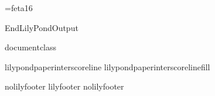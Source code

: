 
\def\ifundefined#1{\expandafter\ifx\csname#1\endcsname\relax}



\font\fetasixteen=feta16
\def\fetafont{\fetasixteen}
\def\fetachar#1{\hbox{\fetasixteen#1}}

\ifx\mustmakelilypondtitle\undefined\else\makelilypondtitle\fi
\ifx\mustmakelilypondpiecetitle\undefined\else\makelilypondpiecetitle\fi
%
\def\SkipLilydefs{\endinput}
\ifundefined{EndLilyPondOutput}
        \def\EndLilyPondOutput{\csname bye\endcsname}
        \def\SkipLilydefs{}
\fi
\SkipLilydefs

\ifundefined{documentclass}
        
\else
        
\fi

\def\botalign#1{\vbox to 0pt{\vss #1}}
\def\leftalign#1{\hbox to 0pt{#1\hss}}

\def\myfilbreak{\par\vfil\penalty200\vfilneg}

\ifundefined{lilypondpaperinterscoreline}
        \def\lilypondpaperinterscoreline{16}
\fi
\ifundefined{lilypondpaperinterscorelinefill}
        \def\lilypondpaperinterscorelinefill{0}
\else
        \def\lilypondpaperinterscorelinefill{1}
\fi

\def\interscoreline{\vskip\lilypondpaperinterscoreline pt plus %
  \lilypondpaperinterscorelinefill fill}

\def\placebox#1#2#3{%
        \botalign{\hbox{\raise #1\leftalign{\kern #2{}#3}}}}%

\ifx\pdfoutput\undefined  
  
\else
  \ifx\pdfoutput\relax
    
  \else
    
  \fi
\fi

\def\EndLilyPondOutput{%
 \vskip 0pt plus \lilypondpaperinterscorelinefill00 fill\csname bye\endcsname
}
\def\postheader{}


\ifx\csname nolilyfooter\endcsname\relax
        \csname lilyfooter\texsuffix\endcsname%
\else
        \csname%
        nolilyfooter\texsuffix\endcsname
\fi
\newdimen\outputscale
\endinput
